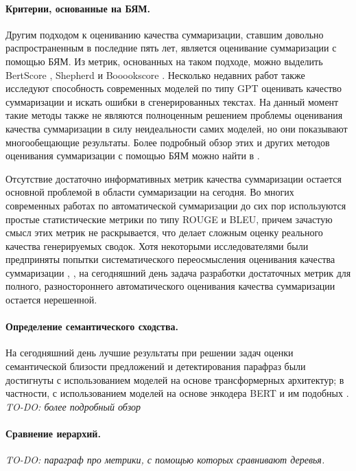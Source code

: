 \documentclass[12pt]{article}
\begin{document}
\paragraph{Критерии, основанные на БЯМ.}Другим подходом к оцениванию качества суммаризации, ставшим довольно распространенным в последние пять лет, является оценивание суммаризации с помощью БЯМ. Из метрик, основанных на таком подходе, можно выделить BertScore \cite{zhang2019bertscore}, Shepherd \cite{wang2023shepherd} и Booookscore \cite{chang2023booookscore}. Несколько недавних работ также исследуют способность современных моделей по типу GPT оценивать качество суммаризации и искать ошибки в сгенерированных текстах. На данный момент такие методы также не являются полноценным решением проблемы оценивания качества суммаризации в силу неидеальности самих моделей, но они показывают многообещающие результаты. Более подробный обзор этих и других методов оценивания суммаризации с помощью БЯМ можно найти в \cite{jin2024comprehensive}. 

Отсутствие достаточно информативных метрик качества суммаризации остается основной проблемой в области суммаризации на сегодня. Во многих современных работах по автоматической суммаризации до сих пор используются простые статистические метрики по типу ROUGE и BLEU, причем зачастую смысл этих метрик не раскрывается, что делает сложным оценку реального качества генерируемых сводок. Хотя некоторыми исследователями были предприняты попытки систематического переосмысления оценивания качества суммаризации \cite{fabbri2021summeval}, \cite{zhang2024benchmarking}, на сегодняшний день задача разработки достаточных метрик для полного, разностороннего автоматического оценивания качества суммаризации остается нерешенной.

\paragraph{Определение семантического сходства.} На сегодняшний день лучшие результаты при решении задач оценки семантической близости предложений и детектирования парафраз были достигнуты с использованием моделей на основе трансформерных архитектур; в частности, с использованием моделей на основе энкодера BERT и им подобных \cite{chandrasekaran2021evolution, vrbanec2023comparison}. \textit{TO-DO: более подробный обзор}

\paragraph{Сравнение иерархий.} \textit{TO-DO: параграф про метрики, с помощью которых сравнивают деревья.}
\end{document}
